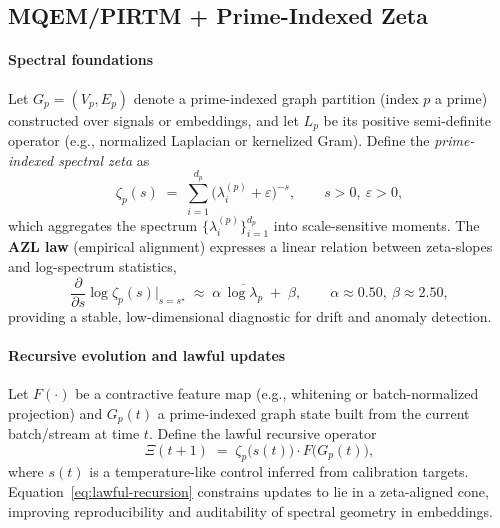 \documentclass[11pt]{article}
\theoremstyle{plain}
\begin{document}
\subsection{MQEM/PIRTM + Prime-Indexed Zeta}

\paragraph{Spectral foundations}
Let $G_p=(V_p,E_p)$ denote a prime-indexed graph partition (index $p$ a prime) constructed over signals or embeddings, and let $L_p$ be its positive semi-definite operator (e.g., normalized Laplacian or kernelized Gram). Define the \emph{prime-indexed spectral zeta} as
\begin{equation}
\zeta_p(s) \;=\; \sum_{i=1}^{d_p} \big(\lambda^{(p)}_i + \varepsilon\big)^{-s}, 
\qquad s>0,\ \varepsilon>0,
\label{eq:prime-zeta}
\end{equation}
which aggregates the spectrum $\{\lambda^{(p)}_i\}_{i=1}^{d_p}$ into scale-sensitive moments. The \textbf{AZL law} (empirical alignment) expresses a linear relation between zeta-slopes and log-spectrum statistics,
\begin{equation}
\frac{\partial}{\partial s}\log \zeta_p(s)\bigg|_{s=s^\star} \;\approx\; \alpha \,\overline{\log \lambda_p} \;+\; \beta, 
\qquad \alpha\approx 0.50,\ \beta\approx 2.50,
\label{eq:azl}
\end{equation}
providing a stable, low-dimensional diagnostic for drift and anomaly detection.

\paragraph{Recursive evolution and lawful updates}
Let $F(\cdot)$ be a contractive feature map (e.g., whitening or batch-normalized projection) and $G_p(t)$ a prime-indexed graph state built from the current batch/stream at time $t$. Define the lawful recursive operator
\begin{equation}
\Xi(t{+}1) \;=\; \zeta_p\!\big(s(t)\big)\cdot F\!\big(G_p(t)\big),
\label{eq:lawful-recursion}
\end{equation}
where $s(t)$ is a temperature-like control inferred from calibration targets. Equation~\eqref{eq:lawful-recursion} constrains updates to lie in a zeta-aligned cone, improving reproducibility and auditability of spectral geometry in embeddings.
\end{document}
